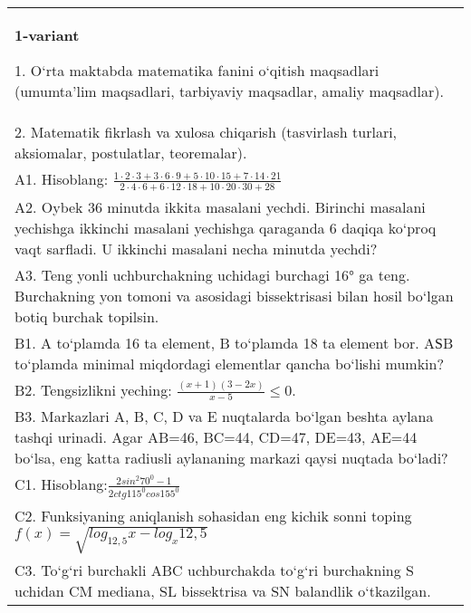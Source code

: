 \documentclass{article}
\begin{document}


\begin{tabular}{m{17cm}}
\textbf{1-variant}

1. O‘rta maktabda matematika fanini o‘qitish maqsadlari (umumta’lim maqsadlari, tarbiyaviy maqsadlar, amaliy maqsadlar). \\
2. Matematik fikrlash va xulosa chiqarish (tasvirlash turlari, aksiomalar, postulatlar, teoremalar). \\
A1. Hisoblang: \(\frac{1 \cdot 2 \cdot 3 + 3 \cdot 6 \cdot 9 + 5 \cdot 10 \cdot 15 + 7 \cdot 14 \cdot 21}{2 \cdot 4 \cdot 6 + 6 \cdot 12 \cdot 18 + 10 \cdot 20 \cdot 30 + 28}\) \\
A2. Oybek 36 minutda ikkita masalani yechdi. Birinchi masalani yechishga ikkinchi masalani yechishga qaraganda 6 daqiqa ko‘proq vaqt sarfladi. U ikkinchi masalani necha minutda yechdi? \\
A3. Teng yonli uchburchakning uchidagi burchagi 16° ga teng. Burchakning yon tomoni va asosidagi bissektrisasi bilan hosil bo‘lgan botiq burchak topilsin. \\
B1. A to‘plamda 16 ta element, B to‘plamda 18 ta element bor. AЅB to‘plamda minimal miqdordagi elementlar qancha bo‘lishi mumkin? \\
B2. Tengsizlikni yeching: \(\frac{ (x + 1) (3 - 2x) }{x - 5} \leq 0\). \\
B3. Markazlari A, B, C, D va E nuqtalarda bo‘lgan beshta aylana tashqi urinadi. Agar AB=46, BC=44, CD=47, DE=43, AE=44 bo‘lsa, eng katta radiusli aylananing markazi qaysi nuqtada bo‘ladi? \\
C1. Hisoblang:\(\frac{2sin^{2}70^{0} - 1}{2ctg115^{0}cos155^{0}}\) \\
C2. Funksiyaning aniqlanish sohasidan eng kichik sonni toping \(f (x) = \sqrt{log_{12,5}x - log_{x}12,5}\) \\
C3. To‘g‘ri burchakli ABC uchburchakda to‘g‘ri burchakning S uchidan CM mediana, SL bissektrisa va SN balandlik o‘tkazilgan. \\

\end{tabular}
\vspace{1cm}
\end{document}
